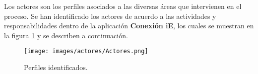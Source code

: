 Los actores son los perfiles asociados a las diversas áreas que intervienen en el proceso. Se han identificado los actores de acuerdo a las actividades y responsabilidades dentro de la aplicación \textbf{Conexión iE}, los cuales se muestran en la figura \ref{fig:perfilesWeb} y se describen a continuación.


    \begin{figure}[h!]
      \begin{center}
	  \texttt{[image: images/actores/Actores.png]}
      \caption{Perfiles identificados.}
      \label{fig:perfilesWeb}
      \end{center}
    \end{figure}

